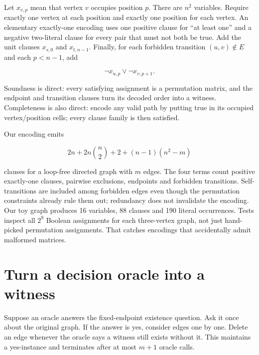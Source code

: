 Let \(x_{v,p}\) mean that vertex \(v\) occupies position \(p\). There
are \(n^2\) variables. Require exactly one vertex at each position and
exactly one position for each vertex. An elementary exactly-one encoding
uses one positive clause for ``at least one'' and a negative two-literal
clause for every pair that must not both be true. Add the unit clauses
\(x_{s,0}\) and \(x_{t,n-1}\). Finally, for each forbidden transition
\((u,v)\notin E\) and each \(p<n-1\), add

\begin{equation}
\neg x_{u,p}\lor\neg x_{v,p+1}.
\end{equation}


Soundness is direct: every satisfying assignment is a permutation
matrix, and the endpoint and transition clauses turn its decoded order
into a witness. Completeness is also direct: encode any valid path by
putting true in its occupied vertex/position cells; every clause family
is then satisfied.

Our encoding emits

\begin{equation}
2n+2n\binom n2+2+(n-1)(n^2-m)
\end{equation}

clauses for a loop-free directed graph with \(m\) edges. The four terms
count positive exactly-one clauses, pairwise exclusions, endpoints and
forbidden transitions. Self-transitions are included among forbidden
edges even though the permutation constraints already rule them out;
redundancy does not invalidate the encoding. Our toy graph produces 16
variables, 88 clauses and 190 literal occurrences. Tests inspect all
\(2^9\) Boolean assignments for each three-vertex graph, not just
hand-picked permutation assignments. That catches encodings that
accidentally admit malformed matrices.

\section{Turn a decision oracle into a
witness}\label{turn-a-decision-oracle-into-a-witness}

Suppose an oracle answers the fixed-endpoint existence question. Ask it
once about the original graph. If the answer is yes, consider edges one
by one. Delete an edge whenever the oracle says a witness still exists
without it. This maintains a yes-instance and terminates after at most
\(m+1\) oracle calls.

